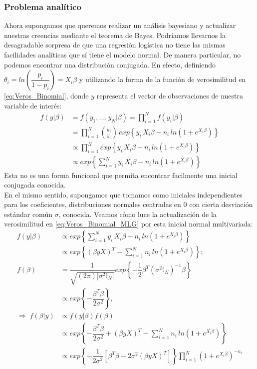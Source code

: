 \subsubsection{Problema analítico} \label{sec:Prob_Analitico}

Ahora supongamos que queremos realizar un análisis bayesiano y actualizar nuestras creencias mediante el teorema de Bayes. Podríamos llevarnos la desagradable sorpresa de que una regresión logística no tiene las mismas facilidades analíticas que sí tiene el modelo normal. De manera particular, no podemos encontrar una distribución conjugada. En efecto, definiendo $\theta_i = ln\left(\dfrac{p_i}{1-p_i}\right)=X_i\beta$ y utilizando la forma de la función de verosimilitud en \eqref{eq:Veros_Binomial}, donde $y$ representa el vector de observaciones de nuestra variable de interés: 
\begin{align} \label{eq:Veros_Binomial_MLG} 
f(y|\beta) &= f(y_1,\dots,y_N|\beta)= \prod_{i=1}^N f(y_i|\beta) \nonumber\\
&= \prod_{i=1}^N {n_i\choose y_i}\,exp\left\lbrace y_i\,X_i\beta-n_i\,ln\left(1+e^{X_i\beta}\right)\right\rbrace \nonumber\\
&\propto \prod_{i=1}^N exp\left\lbrace y_i\,X_i\beta-n_i\,ln\left(1+e^{X_i\beta}\right)\right\rbrace \nonumber\\
&\propto exp\left\lbrace \sum\limits_{i=1}^Ny_i\,X_i\beta-n_i\,ln\left(1+e^{X_i\beta}\right)\right\rbrace 
\end{align}
Esta no es una forma funcional que permita encontrar facilmente una inicial conjugada conocida.\\

En el mismo sentido, supongamos que tomamos como iniciales independientes para los coeficientes, distribuciones normales centradas en $0$ con cierta desviación estándar común $\sigma$, conocida. Veamos cómo luce la actualización de la verosimilitud en \eqref{eq:Veros_Binomial_MLG} por esta inicial normal multivariada: 
\begin{align*}
f(y|\beta) &\propto exp\left\lbrace \sum\limits_{i=1}^N y_i\,X_i\beta-n_i\,ln\left(1+e^{X_i\beta}\right)\right\rbrace \\
&\propto exp\left\lbrace (\beta yX)^T-\sum\limits_{i=1}^Nn_i\,ln\left(1+e^{X_i\beta}\right)\right\rbrace; \\
f(\beta) &= \dfrac{1}{\sqrt{(2\pi)|\sigma^2 \mathbb{I}_N|}}exp\left\lbrace -\dfrac{1}{2}\beta^T(\sigma^2\mathbb{I}_N)^{-1}\beta\right\rbrace \\
&\propto exp\left\lbrace -\dfrac{\beta^T\beta}{2\sigma^2}\right\rbrace, \\
\Rightarrow \; f(\beta|y)&\propto f(y|\beta)f(\beta) \\
&\propto exp\left\lbrace -\dfrac{\beta^T\beta}{2\sigma^2} + (\beta yX)^T-\sum\limits_{i=1}^Nn_i\,ln\left(1+e^{X_i\beta}\right)\right\rbrace \\
&\propto exp\left\lbrace -\dfrac{1}{2\sigma^2}\left[\beta^T\beta - 2\sigma^2(\beta yX)^T\right]\right\rbrace\prod_{i=1}^N \left(1+e^{X_i\beta}\right)^{-n_i}
\end{align*}

